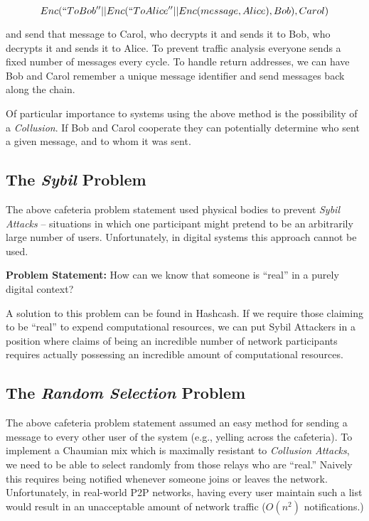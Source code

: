 $$Enc(``To Bob'' || Enc(``To Alice'' || Enc(message, Alice), Bob), Carol)$$

and send that message to Carol, who decrypts it and sends it to Bob,
who decrypts it and sends it to Alice. To prevent traffic analysis
everyone sends a fixed number of messages every cycle.  To handle
return addresses, we can have Bob and Carol remember a unique
message identifier and send messages back along the chain.

Of particular importance to systems using the above method is the
possibility of a \emph{Collusion}. If Bob and Carol cooperate they can
potentially determine who sent a given message, and to whom it was
sent.

\subsection{The \emph{Sybil} Problem}

The above cafeteria problem statement used physical bodies to
prevent \emph{Sybil Attacks} -- situations in which one participant
might pretend to be an arbitrarily large number of
users. Unfortunately, in digital systems this approach cannot be used.

\textbf{Problem Statement:} How can we know that someone is ``real''
in a purely digital context?

A solution to this problem can be found in Hashcash\cite{CHORD}. If we
require those claiming to be ``real'' to expend computational
resources, we can put Sybil Attackers in a position where claims of
being an incredible number of network participants requires actually
possessing an incredible amount of computational resources.

\subsection{The \emph{Random Selection} Problem}

The above cafeteria problem statement assumed an easy method for
sending a message to every other user of the system (e.g., yelling across
the cafeteria). To implement a Chaumian mix which is maximally
resistant to \emph{Collusion Attacks}, we need to be able to select
randomly from those relays who are ``real.'' Naively this requires
being notified whenever someone joins or leaves the network.
Unfortunately, in real-world P2P networks, having every user maintain
such a list would result in an unacceptable amount of network traffic
($O(n^2)$ notifications.)

